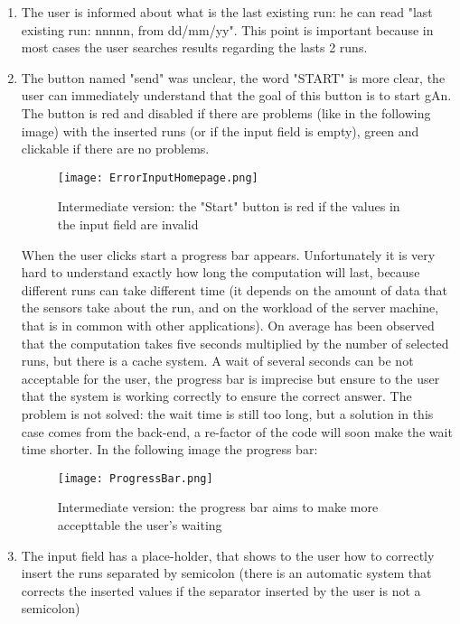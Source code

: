 \begin{enumerate}

\item The user is informed about what is the last existing run: he can read "last existing run: nnnnn, from dd/mm/yy". This point is important because in most cases the user searches results regarding the lasts 2 runs.

\item The button named "send" was unclear, the word "START" is more clear, the user can immediately understand that the goal of this button is to start gAn. The button is red and disabled if there are problems (like in the following image) with the inserted runs (or if the input field is empty), green and clickable if there are no problems.	

\begin{figure}[H]
\centering
\texttt{[image: ErrorInputHomepage.png]}  
\caption{Intermediate version: the "Start" button is red if the values in the input field are invalid}
\end{figure}

When the user clicks start a progress bar appears. Unfortunately it is very hard to understand exactly how long the computation will last, because different runs can take different time (it depends on the amount of data that the sensors take about the run, and on the workload of the server machine, that is in common with other applications). On average has been observed that the computation takes five seconds multiplied by the number of selected runs, but there is a cache system. A wait of several seconds can be not acceptable for the user, the progress bar is imprecise but ensure to the user that the system is working correctly to ensure the correct answer. The problem is not solved: the wait time is still too long, but a solution in this case comes from the back-end, a re-factor of the code will soon make the wait time shorter. In the following image the progress bar:

\begin{figure}[H]
\centering
\texttt{[image: ProgressBar.png]}  
\caption{Intermediate version: the progress bar aims to make more accepttable the user's waiting}
\end{figure}



\item The input field has a place-holder, that shows to the user how to correctly insert the runs separated by semicolon (there is an automatic system that corrects the inserted values if the separator inserted by the user is not a semicolon)
 

\end{enumerate}
